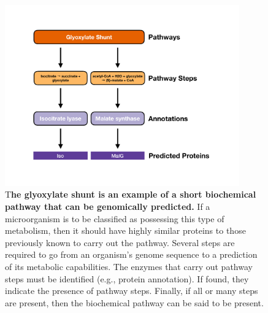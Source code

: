 \begin{figure}[!ht]
  \centering
	\includegraphics[width=0.9\textwidth]{media/pathway_analysis_steps.pdf}
	 \caption[The glyoxylate shunt is an example of a short biochemical pathway 
that can be genomically predicted.]{T\textbf{he glyoxylate shunt is an example 
of a short biochemical pathway that can be genomically predicted.} If a 
microorganism is to be classified as possessing this type of metabolism, then it 
should have highly similar proteins to those previously known to carry out the 
pathway. Several steps are required to go from an organism's genome sequence to 
a prediction of its metabolic capabilities. The enzymes that carry out pathway 
steps must be identified (e.g., protein annotation). If found, they indicate the 
presence of pathway steps. Finally, if all or many steps are present, then the 
biochemical pathway can be said to be present.}
	 \label{fig:pathway-analysis-steps}
\end{figure}

